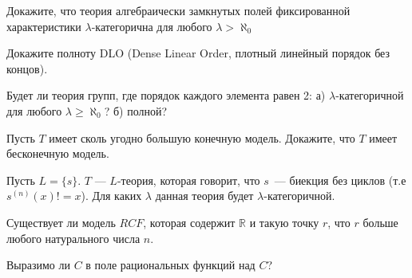 \setcounter{curtask}{13}


\begin{task}
    Докажите, что теория алгебраически замкнутых полей фиксированной характеристики
    $\lambda$-категорична для любого $\lambda > \aleph_0$
\end{task}

\begin{task}
    Докажите полноту DLO (Dense Linear Order, плотный линейный порядок без концов).
\end{task}

\begin{task}
    Будет ли теория групп, где порядок каждого элемента равен 2:
    а) $\lambda$-категоричной для любого $\lambda \ge \aleph_0$?
    б) полной?
\end{task}

\begin{task}
    Пусть $T$ имеет сколь угодно большую конечную модель. Докажите, что $T$ имеет
    бесконечную модель.
\end{task}

\begin{task}
    Пусть $L = \{s\}$. $T$ --- $L$-теория, которая говорит, что $s$~--- биекция без
	циклов (т.е $s^{(n)}(x) != x$). Для каких $\lambda$ данная теория будет
    $\lambda$-категоричной.
\end{task}

\breakline


\begin{ptask}{9}
  	Существует ли модель $RCF$, которая содержит $\mathbb{R}$ и такую точку $r$, что
    $r$ больше любого натурального числа $n$.
\end{ptask}

\begin{ptask}{12}
    Выразимо ли $C$ в поле рациональных функций над $C$?
\end{ptask}
